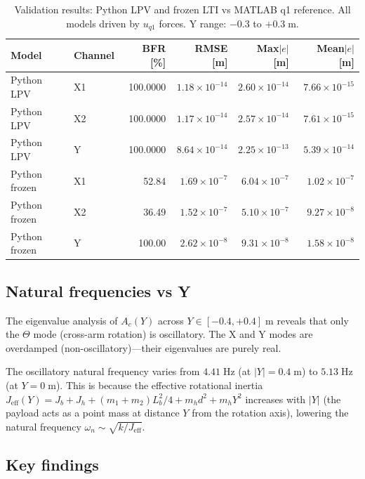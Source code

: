 \documentclass[11pt,a4paper]{article}
\begin{document}
\begin{table}[ht]
\centering
\caption{Validation results: Python LPV and frozen LTI vs MATLAB q1 reference.
  All models driven by $u_{q1}$ forces. Y range: $-0.3$ to $+0.3\;\text{m}$.}
\label{tab:results}
\begin{tabular}{llrrrr}
\toprule
Model & Channel & BFR [\%] & RMSE [m] & Max$|e|$ [m] & Mean$|e|$ [m] \\
\midrule
Python LPV    & X1 & 100.0000 & $1.18 \times 10^{-14}$ & $2.60 \times 10^{-14}$ & $7.66 \times 10^{-15}$ \\
Python LPV    & X2 & 100.0000 & $1.17 \times 10^{-14}$ & $2.57 \times 10^{-14}$ & $7.61 \times 10^{-15}$ \\
Python LPV    & Y  & 100.0000 & $8.64 \times 10^{-14}$ & $2.25 \times 10^{-13}$ & $5.39 \times 10^{-14}$ \\
\midrule
Python frozen & X1 & 52.84 & $1.69 \times 10^{-7}$ & $6.04 \times 10^{-7}$ & $1.02 \times 10^{-7}$ \\
Python frozen & X2 & 36.49 & $1.52 \times 10^{-7}$ & $5.10 \times 10^{-7}$ & $9.27 \times 10^{-8}$ \\
Python frozen & Y  & 100.00 & $2.62 \times 10^{-8}$ & $9.31 \times 10^{-8}$ & $1.58 \times 10^{-8}$ \\
\bottomrule
\end{tabular}
\end{table}

\subsection{Natural frequencies vs Y}

The eigenvalue analysis of $A_c(Y)$ across $Y \in [-0.4, +0.4]\;\text{m}$ reveals that only
the $\Theta$ mode (cross-arm rotation) is oscillatory. The X and Y modes are overdamped
(non-oscillatory)---their eigenvalues are purely real.

The oscillatory natural frequency varies from $4.41\;\text{Hz}$ (at $|Y| = 0.4\;\text{m}$) to
$5.13\;\text{Hz}$ (at $Y = 0\;\text{m}$). This is because the effective rotational inertia
$J_{\text{eff}}(Y) = J_b + J_h + (m_1 + m_2) L_b^2/4 + m_h d^2 + m_h Y^2$ increases with
$|Y|$ (the payload acts as a point mass at distance $Y$ from the rotation axis), lowering the
natural frequency $\omega_n \sim \sqrt{k / J_{\text{eff}}}$.

\subsection{Key findings}
\end{document}
